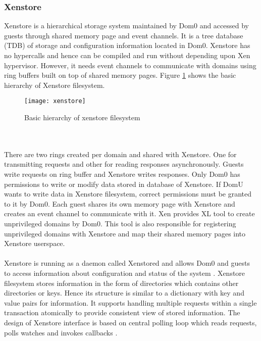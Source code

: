 \subsubsection{Xenstore \label{sec:xenstore}}
Xenstore is a hierarchical storage system maintained by Dom0 and accessed by guests through shared memory page and event channels. It is a tree database (TDB) of storage and configuration information located in Dom0. Xenstore has no hypercalls and hence can be compiled and run without depending upon Xen hypervisor. However, it needs event channels to communicate with domains using ring buffers built on top of shared memory pages. Figure \ref{xenstore} shows the basic hierarchy of Xenstore filesystem.
\begin{figure}[!htbp]
	\centering
	\texttt{[image: xenstore]}
	\caption{Basic hierarchy of xenstore filesystem}
	\label{xenstore}
\end{figure}
\\
\\
There are two rings created per domain and shared with Xenstore. One for transmitting requests and other for reading responses asynchronously. Guests write requests on ring buffer and Xenstore writes responses. Only Dom0 has permissions to write or modify data stored in database of Xenstore. If DomU wants to write data in Xenstore filesystem, correct permissions must be granted to it by Dom0. Each guest shares its own memory page with Xenstore  and creates an event channel to communicate with it. Xen provides XL tool \cite{xl} to create unprivileged domains by Dom0. This tool is also responsible for registering unprivileged domains with Xenstore and map their shared memory pages into Xenstore userspace.
\\
\\
Xenstore is running as a daemon called Xenstored and allows Dom0 and guests to access information about configuration and status of the system \cite{xenstore}. Xenstore filesystem stores information in the form of directories which contains other directories or keys. Hence its structure is similar to a dictionary with key and value pairs for information. It supports handling multiple requests within a single transaction atomically to provide consistent view of stored information. The design of Xenstore interface is based on central polling loop which reads requests, polls watches and invokes callbacks \cite{xenstore_ref}.

